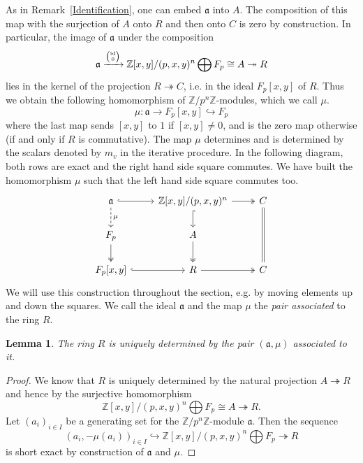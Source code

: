 \documentclass[11pt]{article}
\DeclareMathOperator{\id}{id}
\newtheorem{lemma}[corollary]{Lemma}
\theoremstyle{definition}
\begin{document}
As in Remark~\ref{Identification}, one can embed $\mathfrak{a}$ into $A$. The composition of this map with the surjection of $A$ onto $R$ and then onto $C$ is zero by construction. In particular, the image of $\mathfrak{a}$ under the composition
\[\mathfrak{a}\xrightarrow{\text{\tiny{$\begin{pmatrix}
\id\\
0
\end{pmatrix}$}}} \mathbb{Z}[x,y]/(p,x,y)^n\bigoplus F_p\cong A\twoheadrightarrow R\]
lies in the kernel of the projection $R\twoheadrightarrow C$, i.e. in the ideal $F_p[x,y]$ of $R$. Thus we obtain the following homomorphism of $\mathbb{Z}/p^n\mathbb{Z}$-modules, which we call $\mu$.
\[\mu:\mathfrak{a}\to F_p[x,y]\hookrightarrow F_p\]
where the last map sends $[x,y]$ to $1$ if $[x,y]\neq 0$, and is the zero map otherwise (if and only if $R$ is commutative). The map $\mu$ determines and is determined by the scalars denoted by $m_v$ in the iterative procedure. In the following diagram, both rows are exact and the right hand side square commutes. We have built the homomorphism $\mu$ such that the left hand side square commutes too.
\[\begin{tikzcd}
\mathfrak{a} \arrow[r,hook] \arrow[d,dashrightarrow,"\mu"]& \mathbb{Z}[x,y]/(p,x,y)^n \arrow[d,hook] \arrow[r,twoheadrightarrow]& C \arrow[dd,equal]\\
F_p \arrow[d,twoheadrightarrow] & A\arrow[d,twoheadrightarrow] &\\
F_p[x,y] \arrow[r,hook] & R \arrow[r,twoheadrightarrow]& C
\end{tikzcd}
\]
We will use this construction throughout the section, e.g. by moving elements up and down the squares. We call the ideal $\mathfrak{a}$ and the map $\mu$ the \textit{pair associated} to the ring $R$.

\begin{lemma}
The ring $R$ is uniquely determined by the pair $(\mathfrak{a},\mu)$ associated to it.
\end{lemma}

\begin{proof}
We know that $R$ is uniquely determined by the natural projection $A\twoheadrightarrow R$ and hence by the surjective homomorphism
\[\mathbb{Z}[x,y]/(p,x,y)^n\bigoplus F_p\cong A\twoheadrightarrow R.\]
Let $(a_i)_{i\in I}$ be a generating set for the $\mathbb{Z}/p^n\mathbb{Z}$-module $\mathfrak{a}$. Then the sequence
\[(a_i,-\mu(a_i))_{i\in I}\hookrightarrow \mathbb{Z}[x,y]/(p,x,y)^n\bigoplus F_p\twoheadrightarrow R\]
is short exact by construction of $\mathfrak{a}$ and $\mu$.
\end{proof}
\end{document}
